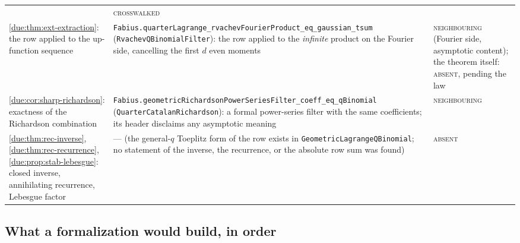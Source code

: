 \documentclass[11pt,oneside]{article}
\theoremstyle{plain}
\theoremstyle{definition}
\theoremstyle{remark}
\begin{document}
\begin{center}
\begin{longtable}{@{}>{\raggedright\arraybackslash}p{}>{\raggedright\arraybackslash}p{}>{\raggedright\arraybackslash}p{}@{}}
& \textsc{crosswalked}\\[0.3em]
\cref{due:thm:ext-extraction}: the row applied to the up-function sequence
& \texttt{Fabius.\allowbreak quarterLagrange\_\allowbreak rvachevFourierProduct\_\allowbreak eq\_\allowbreak gaussian\_\allowbreak tsum} (\texttt{RvachevQBinomialFilter}): the row applied to the \emph{infinite} product on the Fourier side, cancelling the first $d$ even moments
& \textsc{neighbouring} (Fourier side, asymptotic content); the theorem itself: \textsc{absent}, pending the law\\[0.3em]
\cref{due:cor:sharp-richardson}: exactness of the Richardson combination
& \texttt{Fabius.\allowbreak geometricRichardsonPowerSeriesFilter\_\allowbreak coeff\_\allowbreak eq\_\allowbreak qBinomial} (\texttt{QuarterCatalanRichardson}): a formal power-series filter with the same coefficients; its header disclaims any asymptotic meaning
& \textsc{neighbouring}\\[0.3em]
\cref{due:thm:rec-inverse}, \cref{due:thm:rec-recurrence}, \cref{due:prop:stab-lebesgue}: closed inverse, annihilating recurrence, Lebesgue factor
& --- (the general-$q$ Toeplitz form of the row exists in \texttt{GeometricLagrangeQBinomial}; no statement of the inverse, the recurrence, or the absolute row sum was found)
& \textsc{absent}\\
\bottomrule
\end{longtable}
\end{center}

\subsection{What a formalization would build, in order}
\label{due:sec:reg-plan}
\end{document}
